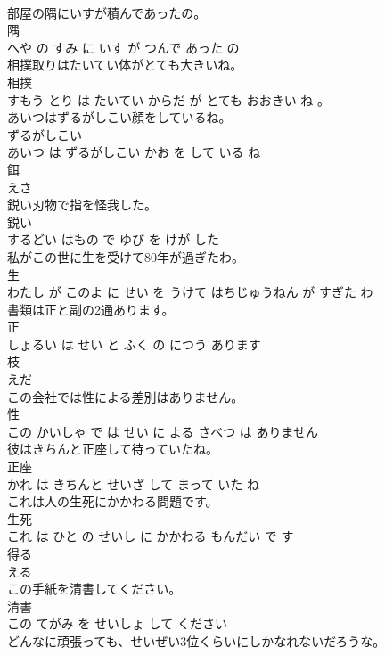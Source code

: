 \documentclass[8pt]{extreport}
\begin{document}
\begin{CJK}{UTF8}{min}
\\	部屋の隅にいすが積んであったの。	
\\	隅 
\\	へや の すみ に いす が つんで あった の			
\\	相撲取りはたいてい体がとても大きいね。	
\\	相撲 
\\	すもう とり は たいてい からだ が とても おおきい ね 。			
\\	あいつはずるがしこい顔をしているね。	
\\	ずるがしこい 
\\	あいつ は ずるがしこい かお を して いる ね			
\\	餌	
\\	えさ			
\\	鋭い刃物で指を怪我した。	
\\	鋭い 
\\	するどい はもの で ゆび を けが した			
\\	私がこの世に生を受けて80年が過ぎたわ。	
\\	生 
\\	わたし が このよ に せい を うけて はちじゅうねん が すぎた わ			
\\	書類は正と副の2通あります。	
\\	正 
\\	しょるい は せい と ふく の につう あります			
\\	枝	
\\	えだ			
\\	この会社では性による差別はありません。	
\\	性 
\\	この かいしゃ で は せい に よる さべつ は ありません			
\\	彼はきちんと正座して待っていたね。	
\\	正座 
\\	かれ は きちんと せいざ して まって いた ね			
\\	これは人の生死にかかわる問題です。	
\\	生死 
\\	これ は ひと の せいし に かかわる もんだい で す			
\\	得る	
\\	える			
\\	この手紙を清書してください。	
\\	清書 
\\	この てがみ を せいしょ して ください			
\\	どんなに頑張っても、せいぜい3位くらいにしかなれないだろうな。	

\end{CJK}
\end{document}
